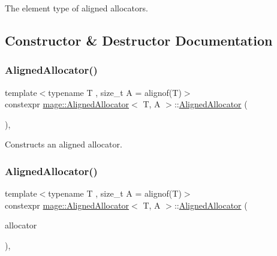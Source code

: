 The element type of aligned allocators. 

\subsection{Constructor \& Destructor Documentation}
\mbox{\label{classmage_1_1_aligned_allocator_a87d49f18fe80cb61ff75cc6d9a8c4949}} 
\subsubsection{\texorpdfstring{Aligned\+Allocator()}{AlignedAllocator()}\hspace{0.1cm}{\footnotesize\ttfamily [1/4]}}
{\footnotesize\ttfamily template$<$typename T , size\+\_\+t A = alignof(\+T)$>$ \\
constexpr \mbox{\hyperlink{classmage_1_1_aligned_allocator}{mage\+::\+Aligned\+Allocator}}$<$ T, A $>$\+::\mbox{\hyperlink{classmage_1_1_aligned_allocator}{Aligned\+Allocator}} (\begin{DoxyParamCaption}{ }\end{DoxyParamCaption})\hspace{0.3cm}{\ttfamily [default]}, {\ttfamily [noexcept]}}

Constructs an aligned allocator. \mbox{\label{classmage_1_1_aligned_allocator_a724b0692cf3c5e217c1281eaabd1ca4b}} 
\subsubsection{\texorpdfstring{Aligned\+Allocator()}{AlignedAllocator()}\hspace{0.1cm}{\footnotesize\ttfamily [2/4]}}
{\footnotesize\ttfamily template$<$typename T , size\+\_\+t A = alignof(\+T)$>$ \\
constexpr \mbox{\hyperlink{classmage_1_1_aligned_allocator}{mage\+::\+Aligned\+Allocator}}$<$ T, A $>$\+::\mbox{\hyperlink{classmage_1_1_aligned_allocator}{Aligned\+Allocator}} (\begin{DoxyParamCaption}\item[{const \mbox{\hyperlink{classmage_1_1_aligned_allocator}{Aligned\+Allocator}}$<$ T, A $>$ \&}]{allocator }\end{DoxyParamCaption})\hspace{0.3cm}{\ttfamily [default]}, {\ttfamily [noexcept]}}

